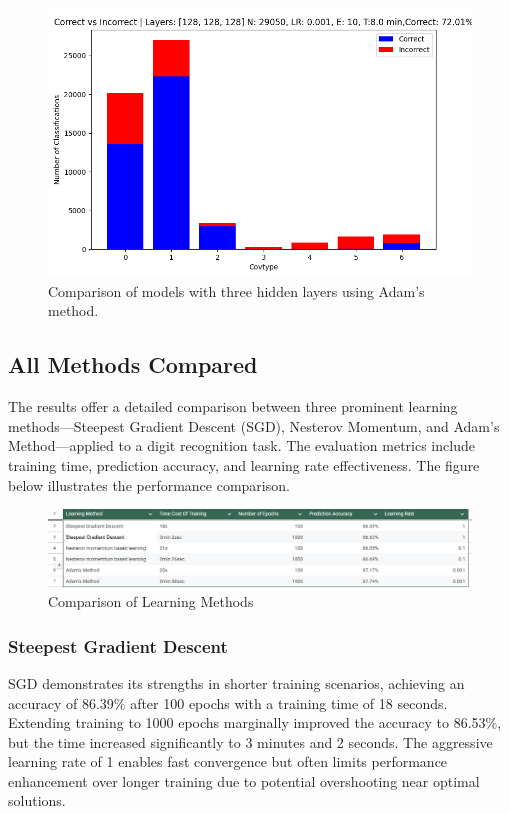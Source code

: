 \documentclass{article}
\begin{document}
\begin{figure}[h!]
    \centering
    \includegraphics[scale=0.4]{2.png}
    \caption{Comparison of models with three hidden layers using Adam's method.}
    \label{fig:three-layer-adam}
\end{figure}
\newpage

\subsection{All Methods Compared}
The results offer a detailed comparison between three prominent learning methods—Steepest Gradient Descent (SGD), Nesterov Momentum, and Adam's Method—applied to a digit recognition task. The evaluation metrics include training time, prediction accuracy, and learning rate effectiveness. The figure below illustrates the performance comparison.

\begin{figure}[h!]
    \centering
    \includegraphics[scale=0.5]{../figs/LearningMethodsCompared.png}
    \caption{Comparison of Learning Methods}
    \label{fig:Comparison}
\end{figure}

\subsubsection{Steepest Gradient Descent}
SGD demonstrates its strengths in shorter training scenarios, achieving an accuracy of 86.39\% after 100 epochs with a training time of 18 seconds. Extending training to 1000 epochs marginally improved the accuracy to 86.53\%, but the time increased significantly to 3 minutes and 2 seconds. The aggressive learning rate of 1 enables fast convergence but often limits performance enhancement over longer training due to potential overshooting near optimal solutions.
\end{document}
